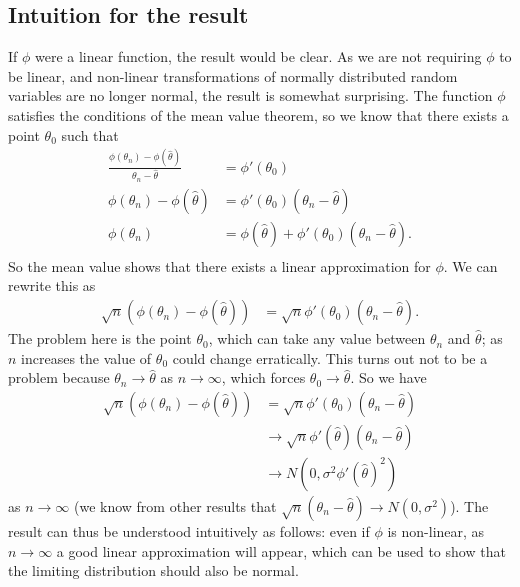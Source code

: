\documentclass[a4paper,10pt]{article}
\begin{document}
\subsection{Intuition for the result}
If $\phi$ were a linear function, the result would be clear.  As we are not requiring $\phi$ to be linear, and non-linear transformations of normally distributed random variables are no longer normal, the result is somewhat surprising.  The function $\phi$ satisfies the conditions of the mean value theorem, so we know that there exists a point $\theta_{0}$ such that
\begin{align*}
\frac{\phi(\theta_{n})-\phi(\hat{\theta})}{\theta_{n} - \hat{\theta}} &= \phi'(\theta_{0}) \\
\phi(\theta_{n})-\phi(\hat{\theta}) &= \phi'(\theta_{0})\left(\theta_{n} - \hat{\theta}\right) \\
\phi(\theta_{n}) &= \phi(\hat{\theta}) + \phi'(\theta_{0})\left(\theta_{n} - \hat{\theta}\right). \\
\end{align*}
So the mean value shows that there exists a linear approximation for $\phi$.  We can rewrite this as
\begin{align*}
\sqrt{n}\left(\phi(\theta_{n})-\phi(\hat{\theta})\right) &= \sqrt{n}\phi'(\theta_{0})\left(\theta_{n} - \hat{\theta}\right).
\end{align*}
The problem here is the point $\theta_{0}$, which can take any value between $\theta_{n}$ and $\hat{\theta}$; as $n$ increases the value of $\theta_{0}$ could change erratically.  This turns out not to be a problem because $\theta_{n} \to \hat{\theta}$ as $n \to \infty$, which forces $\theta_{0} \to \hat{\theta}$.  So we have
\begin{align*}
\sqrt{n}\left(\phi(\theta_{n})-\phi(\hat{\theta})\right) &= \sqrt{n}\phi'(\theta_{0})\left(\theta_{n} - \hat{\theta}\right) \\
&\to  \sqrt{n}\phi'(\hat{\theta})\left(\theta_{n} - \hat{\theta}\right) \\
&\to N(0, \sigma^{2}\phi'(\hat{\theta})^{2})
\end{align*}
as $n \to \infty$ (we know from other results that $\sqrt{n}\left(\theta_{n} - \hat{\theta}\right) \to N(0, \sigma^{2})$).  The result can thus be understood intuitively as follows:  even if $\phi$ is non-linear, as $n \to \infty$ a good linear approximation will appear, which can be used to show that the limiting distribution should also be normal.  
\end{document}
